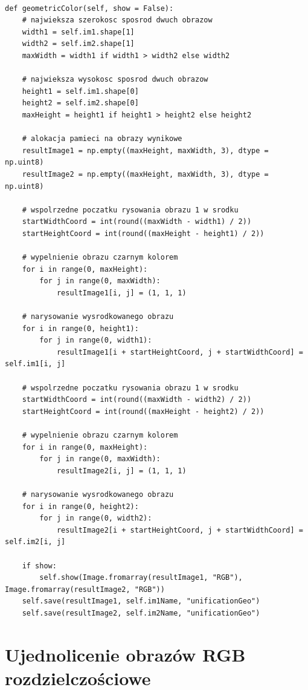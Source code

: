 \documentclass[final,a4paper,openany,12pt]{mwbk}
\begin{document}
\begin{lstlisting}[caption=Geometryczne ujednolicanie obrazów barwnych]

def geometricColor(self, show = False):
	# najwieksza szerokosc sposrod dwuch obrazow
	width1 = self.im1.shape[1]
	width2 = self.im2.shape[1]
	maxWidth = width1 if width1 > width2 else width2
	
	# najwieksza wysokosc sposrod dwuch obrazow
	height1 = self.im1.shape[0]
	height2 = self.im2.shape[0]
	maxHeight = height1 if height1 > height2 else height2
	
	# alokacja pamieci na obrazy wynikowe
	resultImage1 = np.empty((maxHeight, maxWidth, 3), dtype = np.uint8)
	resultImage2 = np.empty((maxHeight, maxWidth, 3), dtype = np.uint8)
	
	# wspolrzedne poczatku rysowania obrazu 1 w srodku
	startWidthCoord = int(round((maxWidth - width1) / 2))
	startHeightCoord = int(round((maxHeight - height1) / 2))
	
	# wypelnienie obrazu czarnym kolorem
	for i in range(0, maxHeight):
		for j in range(0, maxWidth):
			resultImage1[i, j] = (1, 1, 1)
	
	# narysowanie wysrodkowanego obrazu
	for i in range(0, height1):
		for j in range(0, width1):
			resultImage1[i + startHeightCoord, j + startWidthCoord] = self.im1[i, j]
	
	# wspolrzedne poczatku rysowania obrazu 1 w srodku
	startWidthCoord = int(round((maxWidth - width2) / 2))
	startHeightCoord = int(round((maxHeight - height2) / 2))
	
	# wypelnienie obrazu czarnym kolorem
	for i in range(0, maxHeight):
		for j in range(0, maxWidth):
			resultImage2[i, j] = (1, 1, 1)

	# narysowanie wysrodkowanego obrazu
	for i in range(0, height2):
		for j in range(0, width2):
			resultImage2[i + startHeightCoord, j + startWidthCoord] = self.im2[i, j]
	
	if show:
		self.show(Image.fromarray(resultImage1, "RGB"), Image.fromarray(resultImage2, "RGB"))
	self.save(resultImage1, self.im1Name, "unificationGeo")
	self.save(resultImage2, self.im2Name, "unificationGeo")
\end{lstlisting}

\newpage





\section{Ujednolicenie obrazów RGB rozdzielczościowe}
\end{document}
